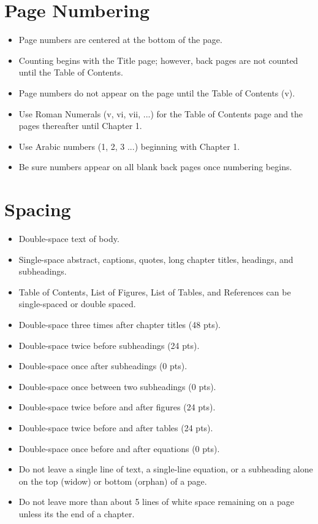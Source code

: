 \section{Page Numbering}
\begin{itemize}
\item	Page numbers are centered at the bottom of the page.
\item	Counting begins with the Title page; however, back pages are not counted until the Table of Contents.
\item	Page numbers do not appear on the page until the Table of Contents (v).
\item	Use Roman Numerals (v, vi, vii, ...) for the Table of Contents page and the pages thereafter until Chapter 1.  
\item	Use Arabic numbers (1, 2, 3 ...) beginning with Chapter 1. 
\item	Be sure numbers appear on all blank back pages once numbering begins.
\end{itemize}

\section{Spacing}
\begin{itemize}
\item	Double-space text of body.
\item	Single-space abstract, captions, quotes, long chapter titles, headings, and subheadings.
\item	Table of Contents, List of Figures, List of Tables, and References can be single-spaced or double spaced.
\item	Double-space three times after chapter titles (48 pts).
\item	Double-space twice before subheadings (24 pts). 
\item	Double-space once after subheadings (0 pts). 
\item	Double-space once between two subheadings (0 pts). 
\item	Double-space twice before and after figures (24 pts).
\item	Double-space twice before and after tables (24 pts).
\item	Double-space once before and after equations (0 pts).
\item	Do not leave a single line of text, a single-line equation, or a subheading alone on the top (widow) or bottom (orphan) of a page.
\item	Do not leave more than about 5 lines of white space remaining on a page unless its the end of a chapter.
\end{itemize}

